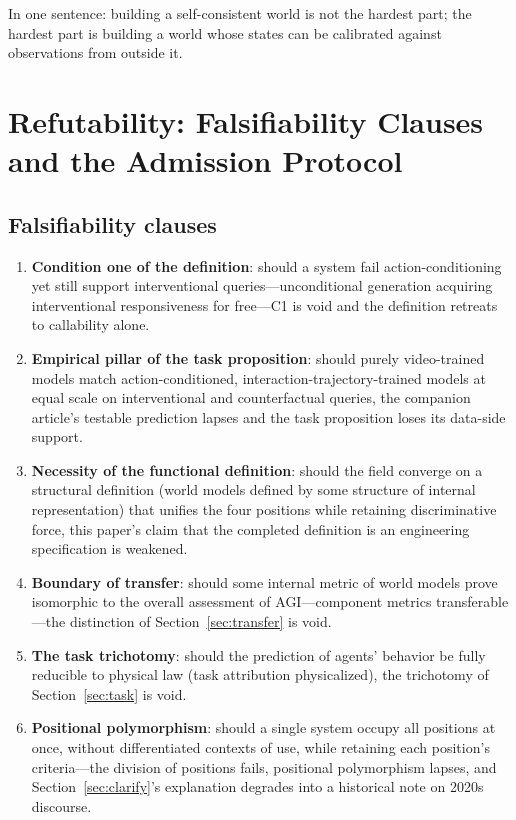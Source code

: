 \documentclass[10pt]{article}
\begin{document}
In one sentence: building a self-consistent world is not the hardest part; the hardest part is building a world whose states can be calibrated against observations from outside it.

\section{Refutability: Falsifiability Clauses and the Admission Protocol}\label{sec:falsifiable}

\subsection{Falsifiability clauses}\label{sec:falsification}

\begin{enumerate}
\item \textbf{Condition one of the definition}: should a system fail action-conditioning yet still support interventional queries---unconditional generation acquiring interventional responsiveness for free---C1 is void and the definition retreats to callability alone.
\item \textbf{Empirical pillar of the task proposition}: should purely video-trained models match action-conditioned, interaction-trajectory-trained models at equal scale on interventional and counterfactual queries, the companion article's testable prediction lapses\cite{yu2026worldmodelq} and the task proposition loses its data-side support.
\item \textbf{Necessity of the functional definition}: should the field converge on a structural definition (world models defined by some structure of internal representation) that unifies the four positions while retaining discriminative force, this paper's claim that the completed definition is an engineering specification is weakened.
\item \textbf{Boundary of transfer}: should some internal metric of world models prove isomorphic to the overall assessment of AGI---component metrics transferable---the distinction of Section~\ref{sec:transfer} is void.
\item \textbf{The task trichotomy}: should the prediction of agents' behavior be fully reducible to physical law (task attribution physicalized), the trichotomy of Section~\ref{sec:task} is void.
\item \textbf{Positional polymorphism}: should a single system occupy all positions at once, without differentiated contexts of use, while retaining each position's criteria---the division of positions fails, positional polymorphism lapses, and Section~\ref{sec:clarify}'s explanation degrades into a historical note on 2020s discourse.

\end{enumerate}
\end{document}
